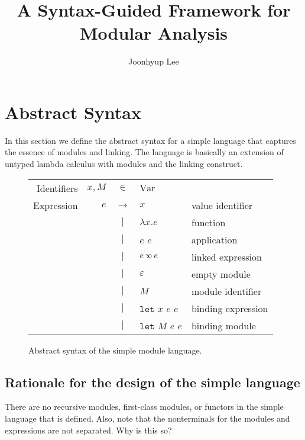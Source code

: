 \documentclass[acmsmall,review]{acmart}\settopmatter{printfolios=true,printccs=false,printacmref=false}
\title{A Syntax-Guided Framework for Modular Analysis}
\author{Joonhyup Lee}
\theoremstyle{definition}
\newcommand*{\vbar}{|}
\newcommand*{\ExprVar}{\text{Var}}
\newcommand*{\semlink}{\mathbin{\rotatebox[origin=c]{180}{$\propto$}}}
\newcommand*{\link}[2]{{#1}\semlink{#2}}
\newcommand*{\Let}{\mathtt{let}}
\begin{document}
\maketitle

\section{Abstract Syntax}

In this section we define the abstract syntax for a simple language that captures the essence of modules and linking.
The language is basically an extension of untyped lambda calculus with modules and the linking construct.

\begin{figure}[htb]
  \centering
  \footnotesize
  \begin{tabular}{rrcll}
    Identifiers & $x,M$ & $\in$         & $\ExprVar$                              \\
    Expression  & $e$   & $\rightarrow$ & $x$                & value identifier   \\
                &       & $\vbar$       & $\lambda x.e$      & function           \\
                &       & $\vbar$       & $e$ $e$            & application        \\
                &       & $\vbar$       & $\link{e}{e}$      & linked expression  \\
                &       & $\vbar$       & $\varepsilon$      & empty module       \\
                &       & $\vbar$       & $M$                & module identifier  \\
                &       & $\vbar$       & $\Let$ $x$ $e$ $e$ & binding expression \\
                &       & $\vbar$       & $\Let$ $M$ $e$ $e$ & binding module     \\
  \end{tabular}
  \caption{Abstract syntax of the simple module language.}
\end{figure}
\subsection{Rationale for the design of the simple language}

There are no recursive modules, first-class modules, or functors in the simple language that is defined.
Also, note that the nonterminals for the modules and expressions are not separated. Why is this so?
\end{document}
